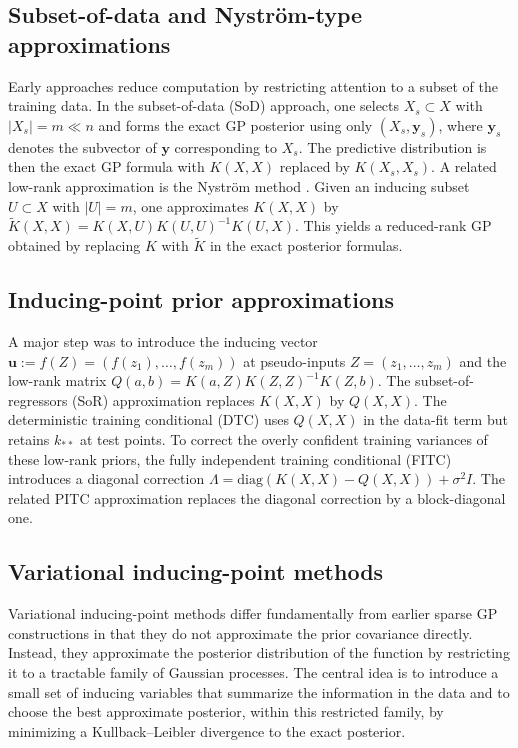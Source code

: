 \documentclass[11pt,a4paper]{article}
\newcommand{\by}{\boldsymbol{y}}
\begin{document}
\subsection{Subset-of-data and Nyström-type approximations}
Early approaches reduce computation by restricting attention to a subset of the training data. In the {subset-of-data} (SoD) approach, one selects $X_s\subset X$ with $|X_s|=m\ll n$ and forms the exact GP posterior using only $(X_s,\by_s)$, where $\by_s$ denotes the subvector of $\by$ corresponding to $X_s$. The predictive distribution is then the exact GP formula with $K(X,X)$ replaced by $K(X_s,X_s)$. A related low-rank approximation is the Nyström method \citep{Williams2000UsingTN}. Given an inducing subset $U\subset X$ with $|U|=m$, one approximates $K(X,X)$ by $\tilde K(X,X)=K(X,U)K(U,U)^{-1}K(U,X)$. This yields a reduced-rank GP obtained by replacing $K$ with $\tilde K$ in the exact posterior formulas.

\subsection{Inducing-point prior approximations}
A major step was to introduce the inducing vector $\boldsymbol{u}:=f(Z)=(f(z_1),\dots,f(z_m))$ at pseudo-inputs $Z=\left(z_1,\dots,z_m\right)$ and the low-rank matrix \begin{math}
    Q(a,b)=K(a,Z)K(Z,Z)^{-1}K(Z,b).
\end{math}
The {subset-of-regressors} (SoR) approximation
\citep{silverman1985some,smola2000sparse,Candela2005AUV} replaces $K(X,X)$ by $Q(X,X)$.
The {deterministic training conditional} (DTC) \citep{csato2002sparse,pmlr-vR4-seeger03a,Candela2005AUV} uses $Q(X,X)$ in the data-fit term but retains $k_{\ast\ast}$ at test points.
To correct the overly confident training variances of these low-rank priors, the
{fully independent training conditional} (FITC) \citep{Snelson2005SparseGP,pmlr-v2-snelson07a,Candela2005AUV} introduces a diagonal correction $\Lambda=\mathrm{diag}(K(X,X)-Q(X,X))+\sigma^2I$.
The related PITC approximation replaces the diagonal correction by a block-diagonal one.

\subsection{Variational inducing-point methods}
Variational inducing-point methods differ fundamentally from earlier sparse GP constructions in that they do not approximate the prior covariance directly. Instead, they approximate the {posterior distribution} of the  function by restricting it to a tractable family of Gaussian processes. The central idea is to introduce a small set of inducing variables that summarize the information in the data and to choose the best approximate posterior, within this restricted family, by minimizing a Kullback--Leibler divergence to the exact posterior.
\end{document}
